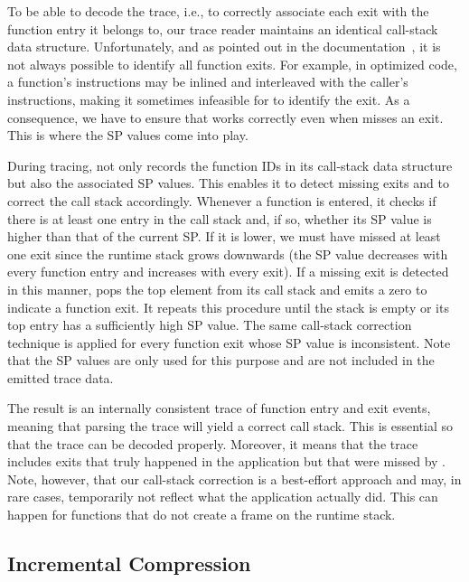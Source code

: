 To be able to decode the trace, i.e., to correctly associate each exit with the function entry it belongs to, our trace reader maintains an identical call-stack data structure. Unfortunately, and as pointed out in the \pin documentation~\cite{???}, it is not always possible to identify all function exits. For example, in optimized code, a function's instructions may be inlined and interleaved with the caller's instructions, making it sometimes infeasible for \pin to identify the exit. As a consequence, we have to ensure that \parlot works correctly even when \pin misses an exit. This is where the SP values come into play.

During tracing, \parlot not only records the function IDs in its call-stack data structure but also the associated SP values. This enables it to detect missing exits and to correct the call stack accordingly. Whenever a function is entered, it checks if there is at least one entry in the call stack and, if so, whether its SP value is higher than that of the current SP. If it is lower, we must have missed at least one exit since the runtime stack grows downwards (the SP value decreases with every function entry and increases with every exit). If a missing exit is detected in this manner, \parlot pops the top element from its call stack and emits a zero to indicate a function exit. It repeats this procedure until the stack is empty or its top entry has a sufficiently high SP value. The same call-stack correction technique is applied for every function exit whose SP value is inconsistent. Note that the SP values are only used for this purpose and are not included in the emitted trace data.

The result is an internally consistent trace of function entry and exit events, meaning that parsing the trace will yield a correct call stack. This is essential so that the trace can be decoded properly. Moreover, it means that the trace includes exits that truly happened in the application but that were missed by \pin. Note, however, that our call-stack correction is a best-effort approach and may, in rare cases, temporarily not reflect what the application actually did. This can happen for functions that do not create a frame on the runtime stack.


\subsection{Incremental Compression}


